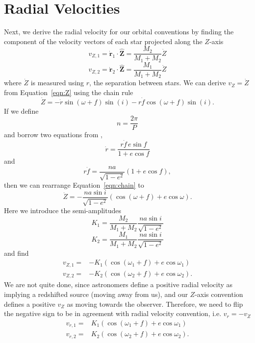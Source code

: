 \documentclass[modern]{aastex61}
\begin{document}
\section{Radial Velocities}
Next, we derive the radial velocity for our orbital conventions by finding the component of the velocity vectors of each star projected along the $Z$-axis
\begin{equation}
v_{Z,1} = \dot{{\bm r}}_1 \cdot \hat{{\bm Z}} = \frac{M_2}{M_1 + M_2} \dot{Z} 
\end{equation}
\begin{equation}
v_{Z,2} = \dot{{\bm r}}_2 \cdot \hat{{\bm Z}} = \frac{M_1}{M_1 + M_2} \dot{Z}
\end{equation}
where $\dot{Z}$ is measured using $r$, the separation between stars. We can derive $v_Z = \dot{Z}$ from Equation~\ref{eqn:Z} using the chain rule
\begin{equation}
  \dot{Z} = - \dot{r} \sin(\omega + f) \sin(i) - r \dot{f} \cos(\omega + f) \sin(i).
  \label{eqn:chain}
\end{equation}
If we define
\begin{equation}
  n = \frac{2 \pi}{P}
\end{equation}
and borrow two equations from \citet{murray10},
\begin{equation}
  \dot{r} = \frac{r \dot{f} \, e \sin f}{1 + e \cos f}
\end{equation}
and
\begin{equation}
  r \dot{f} = \frac{n a }{\sqrt{1 - e^2}} (1 + e \cos f),
\end{equation}
then we can rearrange Equation~\ref{eqn:chain} to
\begin{equation}
  \dot{Z} = -\frac{n a \sin i}{\sqrt{1 - e^2}} (\cos (\omega + f) + e \cos \omega).
\end{equation}
Here we introduce the semi-amplitudes
\begin{equation}
  K_1 = \frac{M_2}{M_1 + M_2} \frac{n a \sin i}{\sqrt{1 - e^2}}
\end{equation}
\begin{equation}
  K_2 = \frac{M_1}{M_1 + M_2} \frac{n a \sin i}{\sqrt{1 - e^2}}
\end{equation}
and find
\begin{eqnarray}
  v_{Z,1} =& - K_1 (\cos (\omega_1 + f) + e \cos \omega_1) \\
  v_{Z,2} =& - K_2 (\cos (\omega_2 + f) + e \cos \omega_2).
\end{eqnarray}
We are not quite done, since astronomers define a positive radial velocity as implying a redshifted source (moving away from us), and our $Z$-axis convention defines a positive $v_Z$ as moving towards the observer. Therefore, we need to flip the negative sign to be in agreement with radial velocity convention, i.e. $v_r = -v_Z$
\begin{eqnarray}
  v_{r,1} =& K_1 (\cos (\omega_1 + f) + e \cos \omega_1) \\
  v_{r,2} =& K_2 (\cos (\omega_2 + f) + e \cos \omega_2).
\end{eqnarray}
\end{document}
